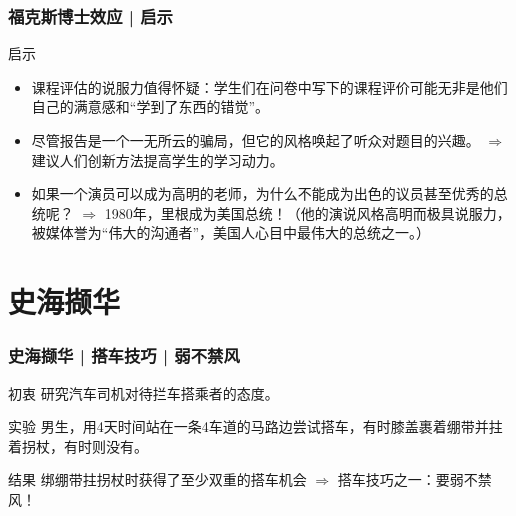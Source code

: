 \begin{frame}
  \frametitle{福克斯博士效应 | 启示}
  \begin{block}{启示}
    \begin{itemize}
      \item 课程评估的说服力值得怀疑：学生们在问卷中写下的课程评价可能无非是他们自己的满意感和“学到了东西的错觉”。
      \item 尽管报告是一个一无所云的骗局，但它的风格唤起了听众对题目的兴趣。 $\Longrightarrow$ 建议人们创新方法提高学生的学习动力。
      \item 如果一个演员可以成为高明的老师，为什么不能成为出色的议员甚至优秀的总统呢？ $\Longrightarrow$ 1980年，里根成为美国总统！（他的演说风格高明而极具说服力，被媒体誉为“伟大的沟通者”，美国人心目中最伟大的总统之一。）
    \end{itemize}
  \end{block}
\end{frame}

% 
\section{}

% 
\section{}

% 
\section{}

% 
\section{}


\section{史海撷华}
\begin{frame}
  \frametitle{史海撷华 | 搭车技巧 | 弱不禁风}
  \begin{block}{初衷}
    研究汽车司机对待拦车搭乘者的态度。
  \end{block}
  \pause
  \begin{block}{实验}
    男生，用4天时间站在一条4车道的马路边尝试搭车，有时膝盖裹着绷带并拄着拐杖，有时则没有。
  \end{block}
  \pause
  \begin{block}{结果}
    绑绷带拄拐杖时获得了至少双重的搭车机会 $\Longrightarrow$ 搭车技巧之一：要弱不禁风！
  \end{block}
\end{frame}

